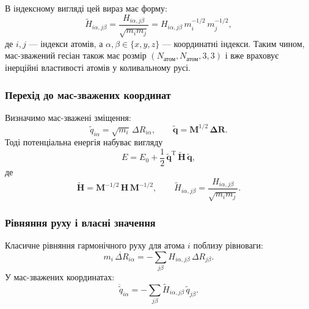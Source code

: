 В індексному вигляді цей вираз має форму:
\begin{equation}\label{eq:mass-weighted-H-index}
    \tilde{H}_{i\alpha, j\beta}
    =
    \frac{H_{i\alpha, j\beta}}{\sqrt{m_i m_j}}
    =
    H_{i\alpha, j\beta}
    \, m_i^{-1/2}
    \, m_j^{-1/2},
\end{equation}
де \(i, j\) --- індекси атомів, а \(\alpha, \beta \in \{x, y, z\}\) --- координатні індекси.
Таким чином, мас-зважений гесіан також має розмір \((N_\text{атом}, N_\text{атом}, 3, 3)\)
і вже враховує інерційні властивості атомів у коливальному русі.



\subsubsection{Перехід до мас-зважених координат}

Визначимо мас-зважені зміщення:
\begin{equation}\label{eq:mass-weighted-q}
    \tilde{q}_{i\alpha} = \sqrt{m_i}\, \Delta R_{i\alpha},
    \qquad
    \mathbf{\tilde{q}} = \mathbf{M}^{1/2}\, \mathbf{\Delta R}.
\end{equation}
Тоді потенціальна енергія набуває вигляду
\begin{equation*}
    E = E_0 + \frac{1}{2}\,
    \mathbf{\tilde{q}}^\mathrm{T}\,
    \mathbf{\tilde{H}}\,
    \mathbf{\tilde{q}},
\end{equation*}
де
\begin{equation*}
    \mathbf{\tilde{H}} =
    \mathbf{M}^{-1/2}\, \mathbf{H}\, \mathbf{M}^{-1/2},
    \qquad
    \tilde{H}_{i\alpha, j\beta} =
    \frac{H_{i\alpha, j\beta}}{\sqrt{m_i m_j}}.
\end{equation*}

\subsubsection{Рівняння руху і власні значення}

Класичне рівняння гармонічного руху для атома $i$ поблизу рівноваги:
\begin{equation*}
    m_i\, \ddot{\Delta R}_{i\alpha}
    = -\sum_{j\beta} H_{i\alpha, j\beta}\, \Delta R_{j\beta}.
\end{equation*}
У мас-зважених координатах:
\begin{equation*}
    \ddot{\tilde{q}}_{i\alpha}
    = -\sum_{j\beta}
        \tilde{H}_{i\alpha, j\beta}\,
        \tilde{q}_{j\beta}.
\end{equation*}

